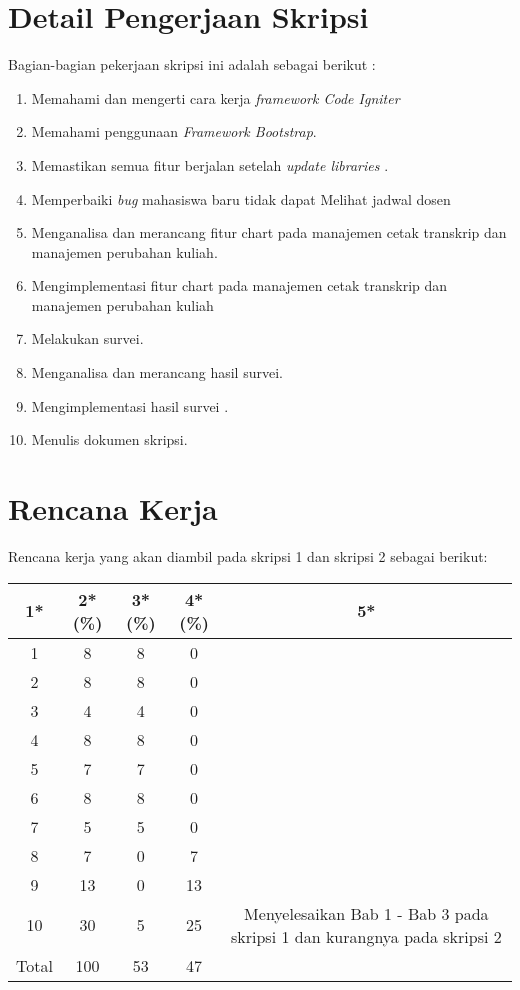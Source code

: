 \documentclass[a4paper,twoside]{article}
\begin{document}
\section{Detail Pengerjaan Skripsi}

Bagian-bagian pekerjaan skripsi ini adalah sebagai berikut :
	\begin{enumerate}
		\item Memahami dan mengerti cara kerja \textit{framework Code Igniter}
		\item Memahami penggunaan \textit{Framework Bootstrap}.
		\item Memastikan semua fitur berjalan setelah \textit{update libraries} .
		\item Memperbaiki \textit{bug} mahasiswa baru tidak dapat Melihat jadwal dosen
		\item Menganalisa dan merancang fitur chart pada manajemen cetak transkrip dan manajemen perubahan kuliah.
		\item Mengimplementasi fitur chart pada manajemen cetak transkrip dan manajemen perubahan kuliah
		\item Melakukan survei.
		\item Menganalisa dan merancang hasil survei.
		\item Mengimplementasi hasil survei	.	
		\item Menulis dokumen skripsi.
	\end{enumerate}

\section{Rencana Kerja}
Rencana kerja yang akan diambil pada skripsi 1 dan skripsi 2 sebagai berikut:
\begin{table}[H]
	\centering
	\begin{tabular}{|c|c|c|c|c|}
		\hline
		1* & 2*(\%) & 3*(\%) & 4*(\%) & 5*\\
		\hline
		1 & 8 & 8 & 0 & \\
		\hline
		2 & 8 & 8 & 0 & \\
		\hline
		3 & 4 & 4 & 0 & \\
		\hline
		4 & 8 & 8 & 0 & \\
		\hline
		5 & 7 & 7 & 0 &\\
		\hline
		6 & 8 & 8 & 0 & \\
		\hline
		7 & 5 & 5 & 0 & \\
		\hline
		8 & 7 & 0 & 7 & \\
		\hline
		9 & 13 & 0 & 13 & \\
		\hline
		10 & 30 & 5 & 25 & Menyelesaikan Bab 1 - Bab 3 pada skripsi 1 dan kurangnya pada skripsi 2\\
		\hline
		Total & 100 & 53 & 47 &  \\
		\hline
		
	\end{tabular}
\end{table}	
\end{document}
